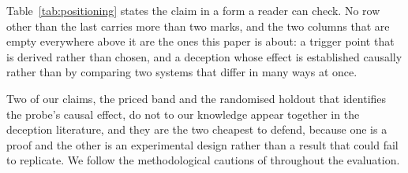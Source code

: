 Table~\ref{tab:positioning} states the claim in a form a reader can check.
No row other than the last carries more than two marks, and the two columns that
are empty everywhere above it are the ones this paper is about: a trigger point
that is derived rather than chosen, and a deception whose effect is established
causally rather than by comparing two systems that differ in many ways at once.

Two of our claims, the priced band and
the randomised holdout that identifies the probe's causal effect, do not to our
knowledge appear together in the deception literature, and they are
the two cheapest to defend, because one is a proof and the other is an
experimental design rather than a result that could fail to replicate. We follow
the methodological cautions of \cite{sommer2010outside,arp2022dos} throughout the
evaluation.
